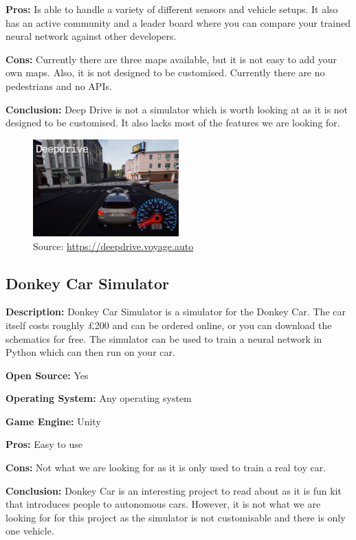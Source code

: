 \textbf{Pros:} Is able to handle a variety of different sensors and vehicle setups. It also has an active community and a leader board where you can compare your trained neural network against other developers. 

\textbf{Cons:} Currently there are three maps available, but it is not easy to add your own maps. Also, it is not designed to be customised. Currently there are no pedestrians and no APIs.

\textbf{Conclusion:} Deep Drive is not a simulator which is worth looking at as it is not designed to be customised. It also lacks most of the features we are looking for. 

\begin{figure}[H]
    \centering
    \includegraphics[width=0.5\textwidth]{Simulators/DeepDrive.JPG}
    \caption{Source: \url{https://deepdrive.voyage.auto}}
\end{figure}

\subsection{Donkey Car Simulator}
\textbf{Description:} Donkey Car Simulator is a simulator for the Donkey Car. The car itself costs roughly £200 and can be ordered online, or you can download the schematics for free. The simulator can be used to train a neural network in Python which can then run on your car. 

\textbf{Open Source:} Yes

\textbf{Operating System:} Any operating system

\textbf{Game Engine:} Unity

\textbf{Pros:} Easy to use

\textbf{Cons:} Not what we are looking for as it is only used to train a real toy car.

\textbf{Conclusion:} Donkey Car is an interesting project to read about as it is fun kit that introduces people to autonomous cars. However, it is not what we are looking for for this project as the simulator is not customisable and there is only one vehicle. 


